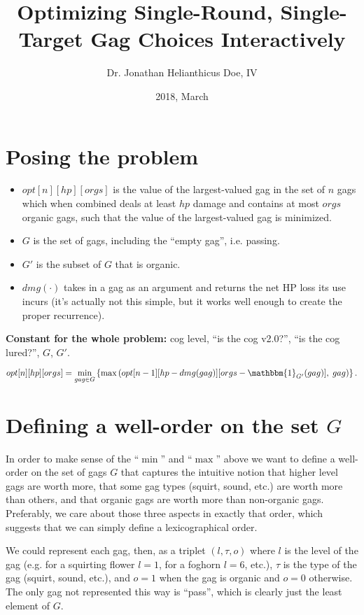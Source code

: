 \documentclass[a4paper]{article}
\title{Optimizing Single-Round, Single-Target Gag Choices Interactively}
\author{Dr. Jonathan Helianthicus Doe, IV}
\date{2018, March}
\begin{document}
\maketitle

\section{Posing the problem}

\begin{itemize}
\item $opt[n][hp][orgs]$ is the value of the largest-valued gag in the set of $n$ gags which when combined deals at least $hp$ damage and contains at most $orgs$ organic gags, such that the value of the largest-valued gag is minimized.
\item $G$ is the set of gags, including the ``empty gag'', i.e. passing.
\item $G'$ is the subset of $G$ that is organic.
\item $dmg(\cdot)$ takes in a gag as an argument and returns the net HP loss its use incurs (it's actually not this simple, but it works well enough to create the proper recurrence).
\end{itemize}

\textbf{Constant for the whole problem:} cog level, ``is the cog v2.0?'', ``is the cog lured?'', $G$, $G'$.

\[
opt[n][hp][orgs] =
  \min_{gag \in G}\left\{\max\left(opt[n - 1][hp - dmg(gag)][orgs - \mathbbm{1}_{G'}(gag)], \; gag\right)\right\}.
\]

\section{Defining a well-order on the set $G$}

In order to make sense of the ``$\min$'' and ``$\max$'' above we want to define a well-order on the set of gags $G$ that captures the intuitive notion that higher level gags are worth more, that some gag types (squirt, sound, etc.) are worth more than others, and that organic gags are worth more than non-organic gags. Preferably, we care about those three aspects in exactly that order, which suggests that we can simply define a lexicographical order.

We could represent each gag, then, as a triplet $\left(l, \tau, o\right)$ where $l$ is the level of the gag (e.g. for a squirting flower $l=1$, for a foghorn $l=6$, etc.), $\tau$ is the type of the gag (squirt, sound, etc.), and $o=1$ when the gag is organic and $o=0$ otherwise. The only gag not represented this way is ``pass'', which is clearly just the least element of $G$.
\end{document}
